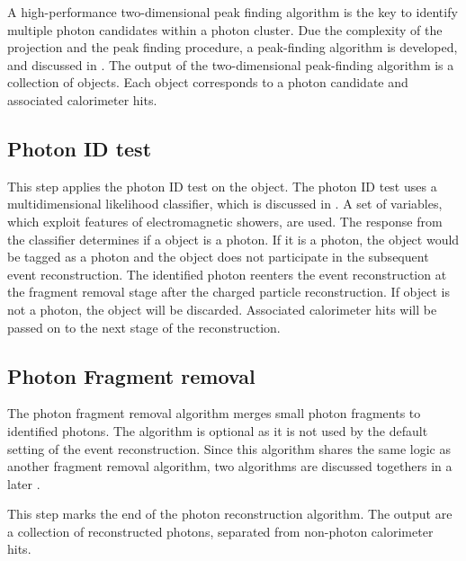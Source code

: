 A high-performance two-dimensional peak finding algorithm is the key to identify multiple photon candidates within a photon cluster. Due the complexity of the projection and the peak finding procedure, a peak-finding algorithm is developed, and discussed in . The output of the two-dimensional peak-finding algorithm is a collection of \ShowerPeak objects. Each \ShowerPeak object corresponds to a photon candidate and associated calorimeter hits.

\subsection{Photon ID test}
\label{sec:photonIDtest}

This step applies the photon ID test on the \ShowerPeak object. The photon ID test uses  a multidimensional likelihood classifier, which is discussed in . A set of variables, which exploit features of electromagnetic showers, are used. The response from the classifier determines if a \ShowerPeak object is a photon. If it is a photon, the \ShowerPeak object would be tagged as a photon and the \ShowerPeak object  does not participate in the subsequent event reconstruction. The identified photon reenters the event reconstruction at the fragment removal stage after the charged particle reconstruction. If \ShowerPeak object  is not a photon, the \ShowerPeak object  will be discarded. Associated calorimeter hits will be passed on to the next stage of the reconstruction.



\subsection{Photon Fragment removal}
\label{sec:photonRecoFragRemoval}

The  photon fragment removal algorithm merges small photon fragments to identified photons. The algorithm is optional as it is not used by the default setting of the event reconstruction. Since this algorithm shares the same logic as another fragment removal algorithm, two algorithms are discussed togethers in a later .


This step marks the end of the photon reconstruction algorithm. The output are a collection of reconstructed photons, separated from non-photon calorimeter hits.

